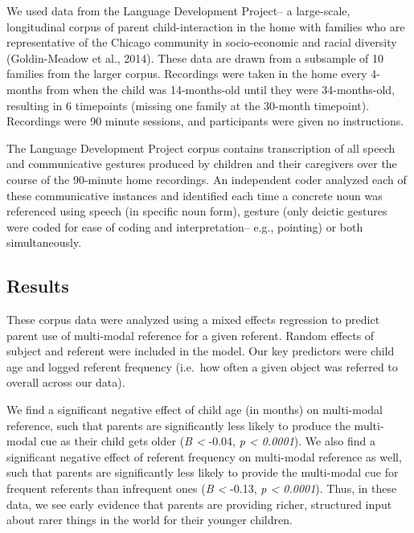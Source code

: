 \documentclass[10pt, letterpaper]{article}
\begin{document}
We used data from the Language Development Project-- a large-scale,
longitudinal corpus of parent child-interaction in the home with
families who are representative of the Chicago community in
socio-economic and racial diversity (Goldin-Meadow et al., 2014). These
data are drawn from a subsample of 10 families from the larger corpus.
Recordings were taken in the home every 4-months from when the child was
14-months-old until they were 34-months-old, resulting in 6 timepoints
(missing one family at the 30-month timepoint). Recordings were 90
minute sessions, and participants were given no instructions.

The Language Development Project corpus contains transcription of all
speech and communicative gestures produced by children and their
caregivers over the course of the 90-minute home recordings. An
independent coder analyzed each of these communicative instances and
identified each time a concrete noun was referenced using speech (in
specific noun form), gesture (only deictic gestures were coded for ease
of coding and interpretation-- e.g., pointing) or both simultaneously.

\subsection{Results}\label{results}

These corpus data were analyzed using a mixed effects regression to
predict parent use of multi-modal reference for a given referent. Random
effects of subject and referent were included in the model. Our key
predictors were child age and logged referent frequency (i.e.~how often
a given object was referred to overall across our data).

We find a significant negative effect of child age (in months) on
multi-modal reference, such that parents are significantly less likely
to produce the multi-modal cue as their child gets older (\emph{B
\textless{}} -0.04, \emph{p \textless{} 0.0001}). We also find a
significant negative effect of referent frequency on multi-modal
reference as well, such that parents are significantly less likely to
provide the multi-modal cue for frequent referents than infrequent ones
(\emph{B \textless{}} -0.13, \emph{p \textless{} 0.0001}). Thus, in
these data, we see early evidence that parents are providing richer,
structured input about rarer things in the world for their younger
children.
\end{document}

